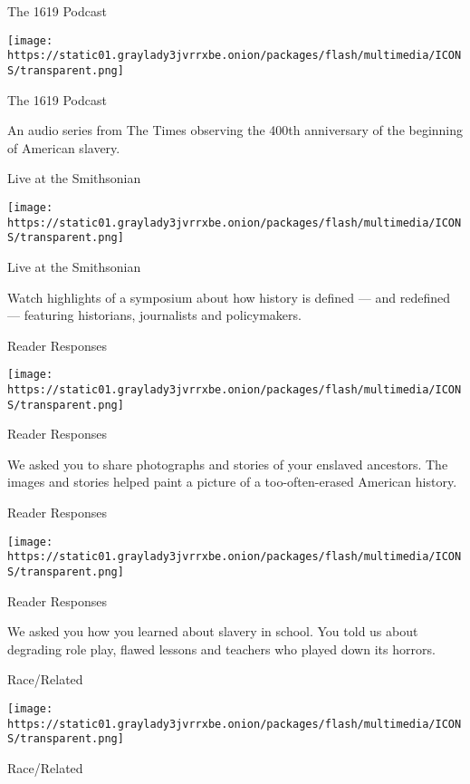The 1619 Podcast

\texttt{[image: https://static01.graylady3jvrrxbe.onion/packages/flash/multimedia/ICONS/transparent.png]}

The 1619 Podcast

An audio series from The Times observing the 400th anniversary of the
beginning of American slavery.

\href{https://www.nytimes3xbfgragh.onion/2019/10/30/magazine/1619-project-live-at-the-smithsonian.html}{}

Live at the Smithsonian

\texttt{[image: https://static01.graylady3jvrrxbe.onion/packages/flash/multimedia/ICONS/transparent.png]}

Live at the Smithsonian

Watch highlights of a symposium about how history is defined --- and
redefined --- featuring historians, journalists and policymakers.

\href{https://www.nytimes3xbfgragh.onion/interactive/2019/10/29/magazine/family-history-slavery.html}{}

Reader Responses

\texttt{[image: https://static01.graylady3jvrrxbe.onion/packages/flash/multimedia/ICONS/transparent.png]}

Reader Responses

We asked you to share photographs and stories of your enslaved
ancestors. The images and stories helped paint a picture of a
too-often-erased American history.

\href{https://www.nytimes3xbfgragh.onion/interactive/2019/09/27/magazine/slavery-education-school-1619-project.html}{}

Reader Responses

\texttt{[image: https://static01.graylady3jvrrxbe.onion/packages/flash/multimedia/ICONS/transparent.png]}

Reader Responses

We asked you how you learned about slavery in school. You told us about
degrading role play, flawed lessons and teachers who played down its
horrors.

\href{https://www.nytimes3xbfgragh.onion/2019/09/06/us/nikole-hannah-jones-interview.html}{}

Race/Related

\texttt{[image: https://static01.graylady3jvrrxbe.onion/packages/flash/multimedia/ICONS/transparent.png]}

Race/Related

